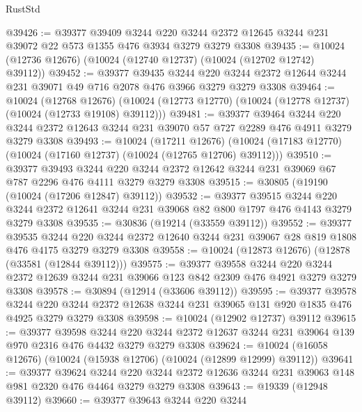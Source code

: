 \begin{lexlean}{RustStd}
\begin{coremodule}
@39426 := @39377
    @39409
    @3244
    @220
    @3244
    @2372
    @12645
    @3244
    @231
    @39072
    @22
    @573
    @1355
    @476
    @3934
    @3279
    @3279
    @3308
@39435 := @10024 (@12736 @12676) (@10024 (@12740 @12737) (@10024 (@12702 @12742) @39112))
@39452 := @39377
    @39435
    @3244
    @220
    @3244
    @2372
    @12644
    @3244
    @231
    @39071
    @49
    @716
    @2078
    @476
    @3966
    @3279
    @3279
    @3308
@39464 := @10024
    (@12768 @12676)
    (@10024 (@12773 @12770) (@10024 (@12778 @12737) (@10024 (@12733 @19108) @39112)))
@39481 := @39377
    @39464
    @3244
    @220
    @3244
    @2372
    @12643
    @3244
    @231
    @39070
    @57
    @727
    @2289
    @476
    @4911
    @3279
    @3279
    @3308
@39493 := @10024
    (@17211 @12676)
    (@10024 (@17183 @12770) (@10024 (@17160 @12737) (@10024 (@12765 @12706) @39112)))
@39510 := @39377
    @39493
    @3244
    @220
    @3244
    @2372
    @12642
    @3244
    @231
    @39069
    @67
    @787
    @2296
    @476
    @4111
    @3279
    @3279
    @3308
@39515 := @30805 (@19190 (@10024 (@17206 @12847) @39112))
@39532 := @39377
    @39515
    @3244
    @220
    @3244
    @2372
    @12641
    @3244
    @231
    @39068
    @82
    @800
    @1797
    @476
    @4143
    @3279
    @3279
    @3308
@39535 := @30836 (@19214 (@33559 @39112))
@39552 := @39377
    @39535
    @3244
    @220
    @3244
    @2372
    @12640
    @3244
    @231
    @39067
    @28
    @819
    @1808
    @476
    @4175
    @3279
    @3279
    @3308
@39558 := @10024 (@12873 @12676) (@12878 (@33581 (@12844 @39112)))
@39575 := @39377
    @39558
    @3244
    @220
    @3244
    @2372
    @12639
    @3244
    @231
    @39066
    @123
    @842
    @2309
    @476
    @4921
    @3279
    @3279
    @3308
@39578 := @30894 (@12914 (@33606 @39112))
@39595 := @39377
    @39578
    @3244
    @220
    @3244
    @2372
    @12638
    @3244
    @231
    @39065
    @131
    @920
    @1835
    @476
    @4925
    @3279
    @3279
    @3308
@39598 := @10024 (@12902 @12737) @39112
@39615 := @39377
    @39598
    @3244
    @220
    @3244
    @2372
    @12637
    @3244
    @231
    @39064
    @139
    @970
    @2316
    @476
    @4432
    @3279
    @3279
    @3308
@39624 := @10024 (@16058 @12676) (@10024 (@15938 @12706) (@10024 (@12899 @12999) @39112))
@39641 := @39377
    @39624
    @3244
    @220
    @3244
    @2372
    @12636
    @3244
    @231
    @39063
    @148
    @981
    @2320
    @476
    @4464
    @3279
    @3279
    @3308
@39643 := @19339 (@12948 @39112)
@39660 := @39377
    @39643
    @3244
    @220
    @3244

\end{coremodule}
\end{lexlean}
